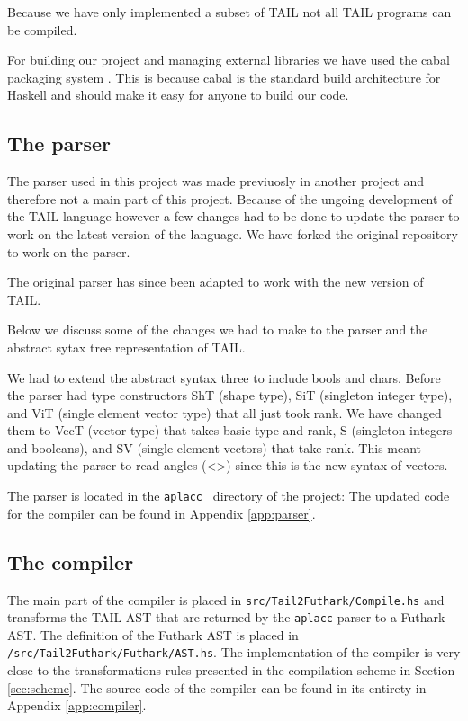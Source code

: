 \documentclass[11pt]{article}
\begin{document}
Because we have only implemented a subset of TAIL not all TAIL programs can be compiled. 

For building our project and managing external libraries we have used the cabal packaging system \cite{cabal}.
This is because cabal is the standard build architecture for Haskell and should make it easy for anyone to build our code.


\subsection{The parser}
\label{sec:parser}
The parser used in this project was made previuosly in another project \cite{APLACC} and therefore not a main part of this project.
Because of the ungoing development of the TAIL language however a few changes had to be done to update the parser to work on the latest version of the language. 
We have forked the original repository to work on the parser.

The original parser has since been adapted to work with the new version of TAIL.

Below we discuss some of the changes we had to make to the parser and the abstract sytax tree representation of TAIL.

We had to extend the abstract syntax three to include bools and chars. 
Before the parser had type constructors ShT (shape type), SiT (singleton integer type), and ViT (single element vector type) that all just took rank.
We have changed them to VecT (vector type) that takes basic type and rank, S (singleton integers and booleans), and SV (single element vectors) that take rank.
This meant updating the parser to read angles (<>) since this is the new syntax of vectors.

The parser is located in the {\tt aplacc } directory of the project: 
The updated code for the compiler can be found in Appendix \ref{app:parser}.

\subsection{The compiler}
The main part of the compiler is placed in {\tt src/Tail2Futhark/Compile.hs} and transforms the TAIL AST that are returned by the {\tt aplacc} parser to a Futhark AST. The definition of the Futhark AST is placed in {\tt /src/Tail2Futhark/Futhark/AST.hs}.
The implementation of the compiler is very close to the transformations rules presented in the compilation scheme in Section \ref{sec:scheme}. The source code of the compiler can be found in its entirety in Appendix \ref{app:compiler}.
\end{document}
